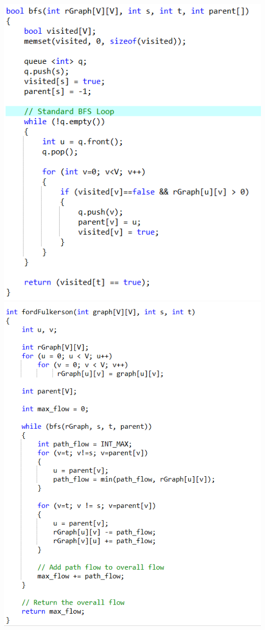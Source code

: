 \documentclass[a4paper, landscape, 8pt]{article}
\begin{document}
\includegraphics[]{MaximumFlow} \clearpage
\includegraphics[]{MaximumFlow-2} \clearpage
\end{document}
